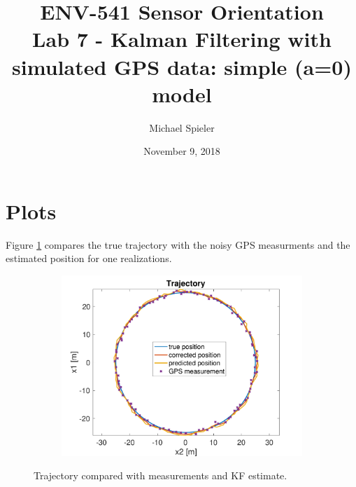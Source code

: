 \documentclass{article}
\title{ENV-541 Sensor Orientation\\Lab 7 - Kalman Filtering with simulated GPS data: simple (a=0) model}
\author{Michael Spieler}
\date{November 9, 2018}
\begin{document}
\maketitle


\section*{Plots}

Figure \ref{fig:traj} compares the true trajectory with the noisy GPS measurments and the estimated position for one realizations.

\begin{figure}[H]
    \centering
    \begin{subfigure}[t]{0.8\textwidth}
        \centering
        \includegraphics[width=\textwidth]{traj}
    \end{subfigure}
    \caption{Trajectory compared with measurements and KF estimate.}
    \label{fig:traj}
\end{figure}
\end{document}
